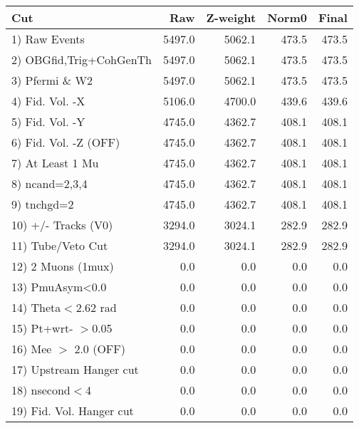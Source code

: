  \begin{table}[h!]\centering
 \begin{tabular}{||l||r|r|r|r||}
 \hline
 \hline
 Cut & Raw & Z-weight & Norm0 & Final \\
 \hline
  1) Raw Events           &      5497.0 &      5062.1 &       473.5 &       473.5 \\
  2) OBGfid,Trig+CohGenTh &      5497.0 &      5062.1 &       473.5 &       473.5 \\
  3) Pfermi \& W2         &      5497.0 &      5062.1 &       473.5 &       473.5 \\
  4) Fid. Vol. -X         &      5106.0 &      4700.0 &       439.6 &       439.6 \\
  5) Fid. Vol. -Y         &      4745.0 &      4362.7 &       408.1 &       408.1 \\
  6) Fid. Vol. -Z (OFF)   &      4745.0 &      4362.7 &       408.1 &       408.1 \\
  7) At Least 1 Mu        &      4745.0 &      4362.7 &       408.1 &       408.1 \\
  8) ncand=2,3,4          &      4745.0 &      4362.7 &       408.1 &       408.1 \\
  9) tnchgd=2             &      4745.0 &      4362.7 &       408.1 &       408.1 \\
 10) +/- Tracks (V0)      &      3294.0 &      3024.1 &       282.9 &       282.9 \\
 11) Tube/Veto Cut        &      3294.0 &      3024.1 &       282.9 &       282.9 \\
 12) 2 Muons (1mux)       &         0.0 &         0.0 &         0.0 &         0.0 \\
 13) PmuAsym<0.0          &         0.0 &         0.0 &         0.0 &         0.0 \\
 14) Theta$<$2.62 rad     &         0.0 &         0.0 &         0.0 &         0.0 \\
 15) Pt+wrt- $>$0.05      &         0.0 &         0.0 &         0.0 &         0.0 \\
 16) Mee $>$ 2.0  (OFF)   &         0.0 &         0.0 &         0.0 &         0.0 \\
 17) Upstream Hanger cut  &         0.0 &         0.0 &         0.0 &         0.0 \\
 18) nsecond$<$4          &         0.0 &         0.0 &         0.0 &         0.0 \\
 19) Fid. Vol. Hanger cut &         0.0 &         0.0 &         0.0 &         0.0 \\

\end{tabular}
\end{table}
